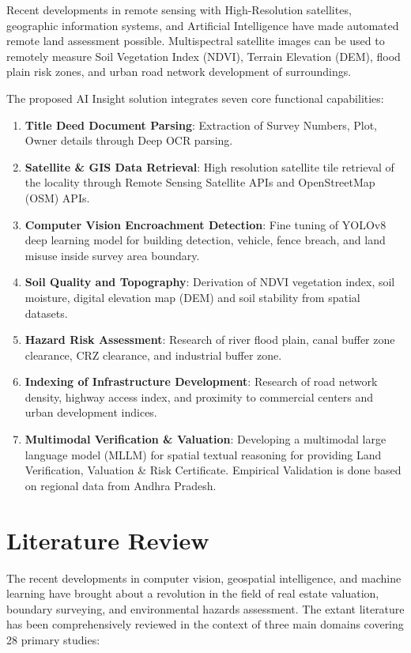 \documentclass[conference]{IEEEtran}
\begin{document}
Recent developments in remote sensing with High-Resolution satellites, geographic information systems, and Artificial Intelligence have made automated remote land assessment possible. Multispectral satellite images can be used to remotely measure Soil Vegetation Index (NDVI), Terrain Elevation (DEM), flood plain risk zones, and urban road network development of surroundings.

The proposed AI Insight solution integrates seven core functional capabilities:
\begin{enumerate}
    \item \textbf{Title Deed Document Parsing}: Extraction of Survey Numbers, Plot, Owner details through Deep OCR parsing.
    \item \textbf{Satellite \& GIS Data Retrieval}: High resolution satellite tile retrieval of the locality through Remote Sensing Satellite APIs and OpenStreetMap (OSM) APIs.
    \item \textbf{Computer Vision Encroachment Detection}: Fine tuning of YOLOv8 deep learning model for building detection, vehicle, fence breach, and land misuse inside survey area boundary.
    \item \textbf{Soil Quality and Topography}: Derivation of NDVI vegetation index, soil moisture, digital elevation map (DEM) and soil stability from spatial datasets.
    \item \textbf{Hazard Risk Assessment}: Research of river flood plain, canal buffer zone clearance, CRZ clearance, and industrial buffer zone.
    \item \textbf{Indexing of Infrastructure Development}: Research of road network density, highway access index, and proximity to commercial centers and urban development indices.
    \item \textbf{Multimodal Verification \& Valuation}: Developing a multimodal large language model (MLLM) for spatial textual reasoning for providing Land Verification, Valuation \& Risk Certificate. Empirical Validation is done based on regional data from Andhra Pradesh.
\end{enumerate}

\section{Literature Review}
The recent developments in computer vision, geospatial intelligence, and machine learning have brought about a revolution in the field of real estate valuation, boundary surveying, and environmental hazards assessment. The extant literature has been comprehensively reviewed in the context of three main domains covering 28 primary studies:
\end{document}
